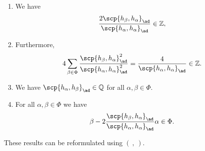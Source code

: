 \begin{enumerate}[label=(\alph*)]
	\item We have
		\[ \frac{2\scp{h_\beta, h_\alpha}_{\ad}}{\scp{h_\alpha, h_\alpha}_{\ad}} \in \mathbb{Z}, \]
	\item Furthermore,
		\[ 4\sum_{\beta \in \Phi} \frac{\scp{h_\beta, h_\alpha}_{\ad}^2}{\scp{h_\alpha, h_\alpha}_{\ad}^2} = \frac{4}{\scp{h_\alpha, h_\alpha}_{\ad}} \in \mathbb{Z}. \]
	\item We have $\scp{h_\alpha, h_\beta}_{\ad} \in \mathbb{Q}$ for all $\alpha, \beta \in \Phi$.
	\item For all $\alpha, \beta \in \Phi$ we have
		\[ \beta - 2\frac{\scp{h_\beta, h_\alpha}_{\ad}}{\scp{h_\alpha, h_\alpha}_{\ad}}\alpha \in \Phi. \]
\end{enumerate}
These results can be reformulated using $(\ ,\ )$.
